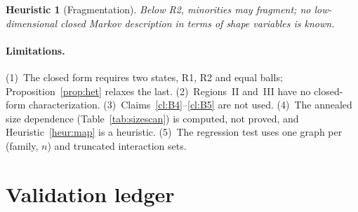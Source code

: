\documentclass[aps,pre,onecolumn,superscriptaddress,amsmath,amssymb,longbibliography]{revtex4-2}
\newtheorem{heuristic}[theorem]{Heuristic}
\theoremstyle{definition}
\theoremstyle{remark}
\begin{document}
\begin{heuristic}[Fragmentation]
Below R2, minorities may fragment; no low-dimensional closed Markov
description in terms of shape variables is known.
\end{heuristic}

\paragraph*{Limitations.} (1)~The closed form requires two states, R1,
R2 and equal balls; Proposition~\ref{prop:het} relaxes the last.
(2)~Regions~II and~III have no closed-form characterization.
(3)~Claims~\ref{cl:B4}--\ref{cl:B5} are not used. (4)~The annealed size
dependence (Table~\ref{tab:sizescan}) is computed, not proved, and
Heuristic~\ref{heur:map} is a heuristic. (5)~The regression test uses one
graph per (family, $n$) and truncated interaction sets.

\section{Validation ledger}
\label{sec:S9}
\end{document}
